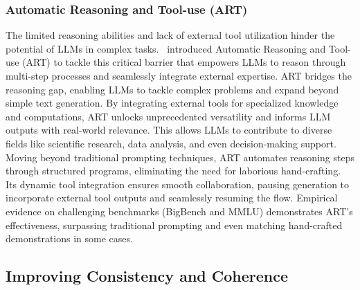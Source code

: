 \documentclass{article}
\begin{document}
\subsubsection{Automatic Reasoning and Tool-use (ART)}
\label{ART}
The limited reasoning abilities and lack of external tool utilization hinder the potential of LLMs in complex tasks.~\cite{paranjape2023art} introduced Automatic Reasoning and Tool-use (ART) to tackle this critical barrier that empowers LLMs to reason through multi-step processes and seamlessly integrate external expertise. ART bridges the reasoning gap, enabling LLMs to tackle complex problems and expand beyond simple text generation. By integrating external tools for specialized knowledge and computations, ART unlocks unprecedented versatility and informs LLM outputs with real-world relevance. This allows LLMs to contribute to diverse fields like scientific research, data analysis, and even decision-making support. Moving beyond traditional prompting techniques, ART automates reasoning steps through structured programs, eliminating the need for laborious hand-crafting. Its dynamic tool integration ensures smooth collaboration, pausing generation to incorporate external tool outputs and seamlessly resuming the flow. Empirical evidence on challenging benchmarks (BigBench and MMLU) demonstrates ART's effectiveness, surpassing traditional prompting and even matching hand-crafted demonstrations in some cases.
\subsection{Improving Consistency and Coherence}
\label{icc}
\end{document}
